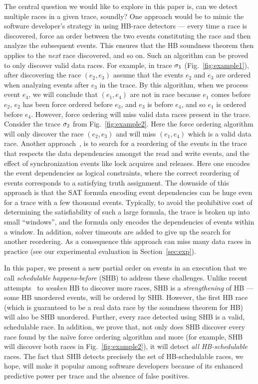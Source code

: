 The central question we would like to explore in this paper is, can we
detect multiple races in a given trace, soundly? One approach would be
to mimic the software developer's strategy in using HB-race detectors
--- every time a race is discovered, force an order between the two
events constituting the race and then analyze the subsequent
events. This ensures that the HB soundness theorem then applies to
the \emph{next} race discovered, and so on. Such an algorithm can be
proved to only discover valid data races. For example, in trace
$\sigma_1$ (Fig.~\ref{fig:example1}), after discovering the race
$(e_2,e_3)$ assume that the events $e_2$ and $e_3$ are ordered when
analyzing events after $e_3$ in the trace. By this algorithm, when we
process event $e_4$, we will conclude that $(e_1,e_4)$ are not in race
because $e_1$ comes before $e_2$, $e_2$ has been force ordered before
$e_3$, and $e_3$ is before $e_4$, and so $e_1$ is ordered before
$e_4$. However, force ordering will miss valid data races present in
the trace. Consider the trace $\sigma_2$ from
Fig.~\ref{fig:example2}. Here the force ordering algorithm will only
discover the race $(e_2,e_3)$ and will miss $(e_1,e_4)$ which is a
valid data race. Another approach~\cite{rv2014}, is to search for a
reordering of the events in the trace that respects the data
dependencies amongst the read and write events, and the effect of
synchronization events like lock acquires and releases. Here one
encodes the event dependencies as logical constraints, where the
correct reordering of events corresponds to a satisfying truth
assignment. The downside of this approach is that the SAT formula
encoding event dependencies can be huge even for a trace with a few
thousand events. Typically, to avoid the prohibitive cost of
determining the satisfiability of such a large formula, the trace is
broken up into small ``windows'', and the formula only encodes the
dependencies of events within a window. In addition, solver timeouts
are added to give up the search for another reordering. As a
consequence this approach can miss many data races in practice (see
our experimental evaluation in Section~\ref{sec:exp}).

In this paper, we present a new partial order on events in an
execution that we call \emph{schedulable happens-before} (SHB) to
address these challenges. Unlike recent attempts~\cite{cp2012,wcp2017}
to \emph{weaken} HB to discover more races, SHB is
a \emph{strengthening} of HB --- some HB unordered events, will be
ordered by SHB. However, the first HB race (which is guaranteed to be
a real data race by the soundness theorem for HB) will also be SHB
unordered. Further, every race detected using SHB is a valid,
schedulable race. In addition, we prove that, not only does SHB
discover every race found by the na\"{i}ve force ordering algorithm
and more (for example, SHB will discover both races in
Fig.~\ref{fig:example2}), it will detect \emph{all HB-schedulable}
races. The fact that SHB detects precisely the set of HB-schedulable
races, we hope, will make it popular among software developers because
of its enhanced predictive power per trace and the absence of false
positives.

